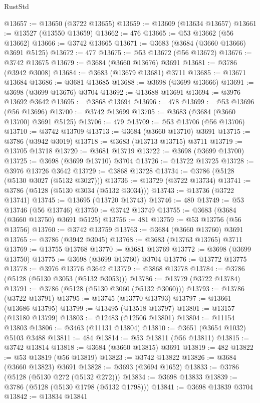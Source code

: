\begin{lexlean}{RustStd}
\begin{coremodule}
{\begin{coremodule}
{{{{{{{{{{{{{{{{{{{{{{{{{{{{{{{{{{{{{{{{{{{{{{{@13657 := @13650 (@3722 @13655)
@13659 := @13609 (@13634 @13657)
@13661 := @13527 (@13550 @13659)
@13662 := 476
@13665 := @53 @13662 (@56 @13662)
@13666 := @3742 @13665
@13671 := @3683 (@3684 (@3660 @13666) @3691 @5125)
@13672 := 477
@13675 := @53 @13672 (@56 @13672)
@13676 := @3742 @13675
@13679 := @3684 (@3660 @13676) @3691
@13681 := @3786 (@3942 @3008)
@13684 := @3683 (@13679 @13681) @3711
@13685 := @13671 @13684
@13686 := @3681 @13685
@13688 := @3698 (@3699 @13666)
@13691 := @3698 (@3699 @13676) @3704
@13692 := @13688 @13691
@13694 := @3976 @13692 @3642
@13695 := @3868 @13694
@13696 := 478
@13699 := @53 @13696 (@56 @13696)
@13700 := @3742 @13699
@13705 := @3683 (@3684 (@3660 @13700) @3691 @5125)
@13706 := 479
@13709 := @53 @13706 (@56 @13706)
@13710 := @3742 @13709
@13713 := @3684 (@3660 @13710) @3691
@13715 := @3786 (@3942 @3019)
@13718 := @3683 (@13713 @13715) @3711
@13719 := @13705 @13718
@13720 := @3681 @13719
@13722 := @3698 (@3699 @13700)
@13725 := @3698 (@3699 @13710) @3704
@13726 := @13722 @13725
@13728 := @3976 @13726 @3642
@13729 := @3868 @13728
@13734 := @3786 (@5128 (@5130 @3027 (@5132 @3027)))
@13736 := @13729 (@3722 @13734)
@13741 := @3786 (@5128 (@5130 @3034 (@5132 @3034)))
@13743 := @13736 (@3722 @13741)
@13745 := @13695 (@13720 @13743)
@13746 := 480
@13749 := @53 @13746 (@56 @13746)
@13750 := @3742 @13749
@13755 := @3683 (@3684 (@3660 @13750) @3691 @5125)
@13756 := 481
@13759 := @53 @13756 (@56 @13756)
@13760 := @3742 @13759
@13763 := @3684 (@3660 @13760) @3691
@13765 := @3786 (@3942 @3045)
@13768 := @3683 (@13763 @13765) @3711
@13769 := @13755 @13768
@13770 := @3681 @13769
@13772 := @3698 (@3699 @13750)
@13775 := @3698 (@3699 @13760) @3704
@13776 := @13772 @13775
@13778 := @3976 @13776 @3642
@13779 := @3868 @13778
@13784 := @3786 (@5128 (@5130 @3053 (@5132 @3053)))
@13786 := @13779 (@3722 @13784)
@13791 := @3786 (@5128 (@5130 @3060 (@5132 @3060)))
@13793 := @13786 (@3722 @13791)
@13795 := @13745 (@13770 @13793)
@13797 := @13661 (@13686 @13795)
@13799 := @13495 (@13518 @13797)
@13801 := @13157 (@13180 @13799)
@13803 := @12483 (@12506 @13801)
@13804 := @11154 @13803
@13806 := @3463 (@11131 @13804)
@13810 := @3651 (@3654 @1032) @5103 @3488
@13811 := 484
@13814 := @53 @13811 (@56 @13811)
@13815 := @3742 @13814
@13818 := @3684 (@3660 @13815) @3691
@13819 := 482
@13822 := @53 @13819 (@56 @13819)
@13823 := @3742 @13822
@13826 := @3684 (@3660 @13823) @3691
@13828 := @3693 (@3694 @1652)
@13833 := @3786 (@5128 (@5130 @272 (@5132 @272)))
@13834 := @3698 @13833
@13839 := @3786 (@5128 (@5130 @1798 (@5132 @1798)))
@13841 := @3698 @13839 @3704
@13842 := @13834 @13841
}}}}}}}}}}}}}}}}}}}}}}}}}}}}}}}}}}}}}}}}}}}}}}}
\end{coremodule}}
\end{coremodule}
\end{lexlean}
